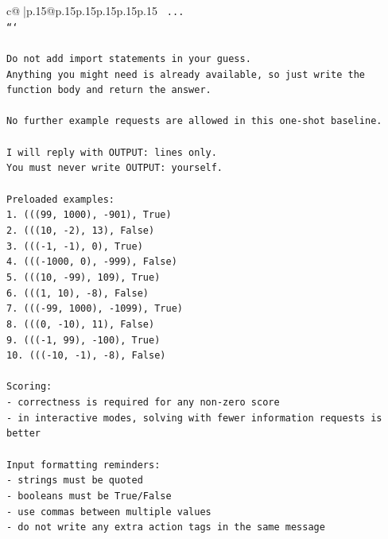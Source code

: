 \documentclass{article}
\begin{document}
{\begin{supertabular}{c@{$\;$}|p{.15\linewidth}@{}p{.15\linewidth}p{.15\linewidth}p{.15\linewidth}p{.15\linewidth}p{.15\linewidth}}
{{{\texttt{    ...} \\
\texttt{```} \\
\\ 
\texttt{Do not add import statements in your guess.} \\
\texttt{Anything you might need is already available, so just write the function body and return the answer.} \\
\\ 
\texttt{No further example requests are allowed in this one{-}shot baseline.} \\
\\ 
\texttt{I will reply with OUTPUT: lines only.} \\
\texttt{You must never write OUTPUT: yourself.} \\
\\ 
\texttt{Preloaded examples:} \\
\texttt{1. (((99, 1000), {-}901), True)} \\
\texttt{2. (((10, {-}2), 13), False)} \\
\texttt{3. ((({-}1, {-}1), 0), True)} \\
\texttt{4. ((({-}1000, 0), {-}999), False)} \\
\texttt{5. (((10, {-}99), 109), True)} \\
\texttt{6. (((1, 10), {-}8), False)} \\
\texttt{7. ((({-}99, 1000), {-}1099), True)} \\
\texttt{8. (((0, {-}10), 11), False)} \\
\texttt{9. ((({-}1, 99), {-}100), True)} \\
\texttt{10. ((({-}10, {-}1), {-}8), False)} \\
\\ 
\texttt{Scoring:} \\
\texttt{{-} correctness is required for any non{-}zero score} \\
\texttt{{-} in interactive modes, solving with fewer information requests is better} \\
\\ 
\texttt{Input formatting reminders:} \\
\texttt{{-} strings must be quoted} \\
\texttt{{-} booleans must be True/False} \\
\texttt{{-} use commas between multiple values} \\
\texttt{{-} do not write any extra action tags in the same message} \\
\\ 
}}}
\end{supertabular}}
\end{document}
